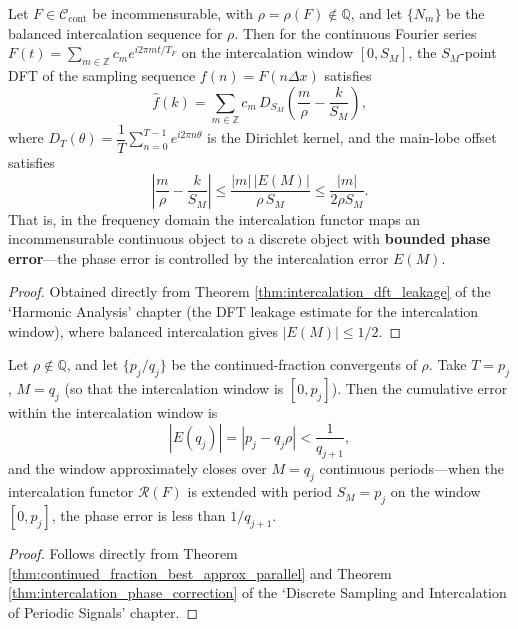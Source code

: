 \begin{theorem}\label{thm:intercalation_phase_correction}
Let $F\in\mathcal{C}_{\text{cont}}$ be incommensurable, with $\rho=\rho(F)\notin\mathbb{Q}$, and let $\{N_m\}$ be the balanced intercalation sequence for $\rho$. Then for the continuous Fourier series $\displaystyle F(t)=\sum_{m\in\mathbb{Z}}c_m e^{i2\pi mt/T_F}$ on the intercalation window $[0,S_M]$, the $S_M$-point DFT of the sampling sequence $f(n)=F(n\Delta x)$ satisfies
\[
\hat{f}(k)=\sum_{m\in\mathbb{Z}}c_m\,D_{S_M}\!\left(\frac{m}{\rho}-\frac{k}{S_M}\right),
\]
where $D_T(\theta)=\dfrac{1}{T}\sum_{n=0}^{T-1}e^{i2\pi n\theta}$ is the Dirichlet kernel, and the main-lobe offset satisfies
\[
\left|\frac{m}{\rho}-\frac{k}{S_M}\right|\le\frac{|m|\,|E(M)|}{\rho\,S_M}\le\frac{|m|}{2\rho S_M}.
\]
That is, in the frequency domain the intercalation functor maps an incommensurable continuous object to a discrete object with \textbf{bounded phase error}---the phase error is controlled by the intercalation error $E(M)$.
\end{theorem}

\begin{proof}
Obtained directly from Theorem \ref{thm:intercalation_dft_leakage} of the `Harmonic Analysis' chapter (the DFT leakage estimate for the intercalation window), where balanced intercalation gives $|E(M)|\le 1/2$.
\end{proof}

\begin{corollary}\label{cor:intercalation_window_closure}
Let $\rho\notin\mathbb{Q}$, and let $\{p_j/q_j\}$ be the continued-fraction convergents of $\rho$. Take $T=p_j$, $M=q_j$ (so that the intercalation window is $[0,p_j]$). Then the cumulative error within the intercalation window is
\[
|E(q_j)|=|p_j-q_j\rho|<\frac{1}{q_{j+1}},
\]
and the window approximately closes over $M=q_j$ continuous periods---when the intercalation functor $\mathcal{R}(F)$ is extended with period $S_M=p_j$ on the window $[0,p_j]$, the phase error is less than $1/q_{j+1}$.
\end{corollary}

\begin{proof}
Follows directly from Theorem \ref{thm:continued_fraction_best_approx_parallel} and Theorem \ref{thm:intercalation_phase_correction} of the `Discrete Sampling and Intercalation of Periodic Signals' chapter.
\end{proof}

